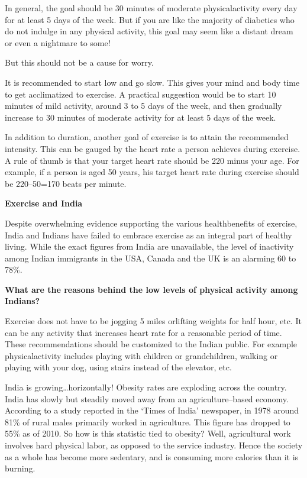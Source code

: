 In general, the goal should be 30 minutes of moderate physical\break activity every day for at least 5 days of the week. But if you are like the majority of diabetics who do not indulge in any physical activity, this goal may seem like a distant dream or even a nightmare to some!

But this should not be a cause for worry.

It is recommended to start low and go slow. This gives your mind and body time to get acclimatized to exercise. A practical suggestion would be to start 10 minutes of mild activity, around 3 to 5 days of the week, and then gradually increase to 30 minutes of moderate activity for at least 5 days of the week.

In addition to duration, another goal of exercise is to attain the recommended intensity. This can be gauged by the heart rate a person achieves during exercise. A rule of thumb is that your target heart rate should be 220 minus your age. For example, if a person is aged 50 years, his target heart rate during exercise should be 220–50=170 beats per minute.

\noindent\textbf{Exercise and India}

Despite overwhelming evidence supporting the various health\break benefits of exercise, India and Indians have failed to embrace exercise as an integral part of healthy living. While the exact figures from India are unavailable, the level of inactivity among Indian immigrants in the USA, Canada and the UK is an alarming 60 to 78\%.

\clearpage

\noindent\textbf{What are the reasons behind the low levels of physical activity among Indians?}

Exercise does not have to be jogging 5 miles or\break lifting weights for half hour, etc. It can be any activity that increases heart rate for a reasonable period of time. These recommendations should be customized to the Indian public. For example physical\break activity includes playing with children or grandchildren, walking or playing with your dog, using stairs instead of the elevator, etc.

India is growing…horizontally! Obesity rates are exploding across the country. India has slowly but steadily moved away from an agri\-cul\-ture–based economy. According to a study reported in the ‘Times of India’ newspaper, in 1978 around 81\% of rural males primarily worked in agriculture. This figure has dropped to 55\% as of 2010. So how is this statistic tied to obesity? Well, agricultural work involves hard physical labor, as opposed to the service industry. Hence the society as a whole has become more sedentary, and is consuming more calories than it is burning.

